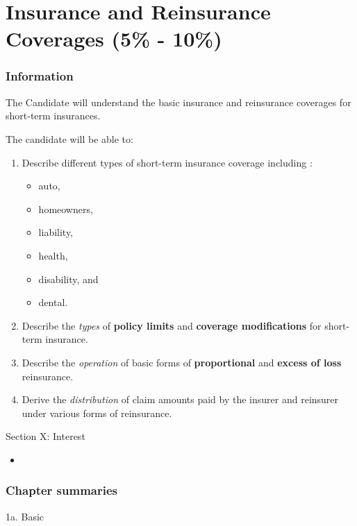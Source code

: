 \chapter[Insurance and Reinsurance Coverages]{Insurance and Reinsurance Coverages (5\% - 10\%)}

\subsection{Information}

\begin{distributions}[Objective]
The Candidate will understand the basic insurance and reinsurance coverages for short-term insurances.
\end{distributions}

\begin{outcomes}
The candidate will be able to:
\begin{enumerate}[label = \alph*), leftmargin = *]
	\item	Describe different types of short-term insurance coverage including :
		\begin{itemize}[leftmargin = *]
		\item	auto, 
		\item	homeowners, 
		\item	liability, 
		\item	health,
		\item	disability, and 
		\item	dental.
		\end{itemize}
	\item	Describe the \textit{types} of \textbf{policy limits} and \textbf{coverage modifications} for short-term insurance.
	\item	Describe the \textit{operation} of basic forms of \textbf{proportional} and \textbf{excess of loss} reinsurance.
	\item	Derive the \textit{distribution} of claim amounts paid by the insurer and reinsurer under various forms of reinsurance.
\end{enumerate}
\end{outcomes}

\begin{ASM_chapter}
Section X: Interest 
\begin{itemize}[leftmargin = *]
	\item	{}
\end{itemize}
\end{ASM_chapter}

\subsection{Chapter summaries}

\begin{CHPT_SUMM_AUTO}[label = {L.-1a}]{1a. Basic}

\end{CHPT_SUMM_AUTO}
